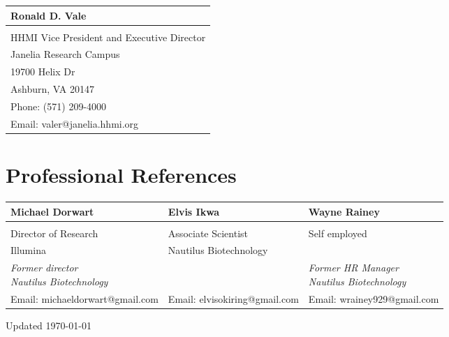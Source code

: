 \documentclass[12pt,letterpaper]{report}
\begin{document}
    \vspace{3em}

    \begin{tabular}{l}
        Ronald D. Vale \\
        \hline \\
        HHMI Vice President and Executive Director \\
        Janelia Research Campus \\
        19700 Helix Dr \\
        Ashburn, VA 20147 \\
        Phone: (571) 209-4000\\
        Email: valer@janelia.hhmi.org
    \end{tabular}

    \section*{Professional References}

    \begin{tabular}{lll}
        Michael Dorwart & Elvis Ikwa & Wayne Rainey\\
        \hline \\
        Director of Research &  Associate Scientist & Self employed\\
        Illumina & Nautilus Biotechnology & \\
        \makecell{\textit{Former director} \\ \textit{Nautilus Biotechnology}}&  & \makecell{\textit{Former HR Manager} \\ \textit{Nautilus Biotechnology}} \\
        Email: michaeldorwart@gmail.com & Email: elvisokiring@gmail.com & Email: wrainey929@gmail.com
    \end{tabular}



    \begin{center}
        \vfill
        Updated \monthyeardate\today
    \end{center}
\end{document}
